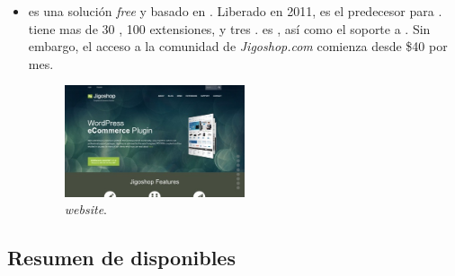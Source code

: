\begin{itemize}
	\item \textbf{\nameJigoshop} es una solución \ecommerce \textit{free} y \opensource basado en \wordPress. Liberado en 2011, \nameJigoshop es el predecesor para \nameWooCommerce. \nameJigoshop tiene mas de 30   \themes, 100 extensiones, y tres \theme \frameworks. \nameJigoshop es  \free, así como el soporte a \wordPressOrg. Sin embargo, el acceso a la comunidad de \textit{Jigoshop.com} comienza desde \$40 por mes.

	\begin{figure}[H]
		\centering
		\includegraphics[width=0.5\textwidth]{figuras/cap1/JigoshopWebsite.jpg}
		\caption{\nameJigoshop \textit{website}\cite{online_Jigoshop}.}
	\end{figure}

\end{itemize}

\subsection{Resumen de \frameworks disponibles}

